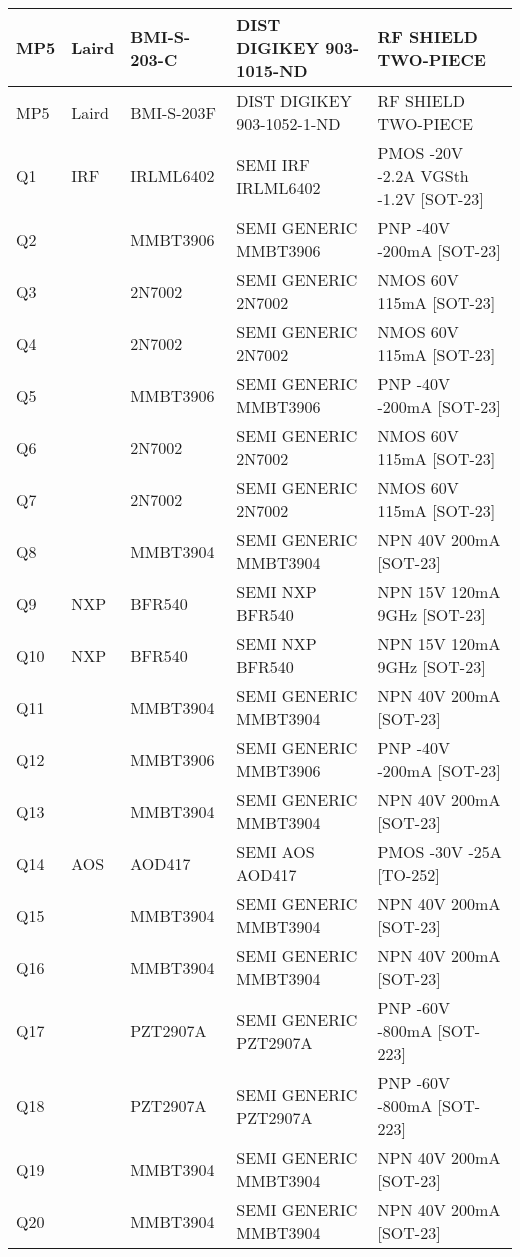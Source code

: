 \begin{longtable}{|l|l|l|l|l|}
\hline
MP5 & Laird & BMI-S-203-C & DIST DIGIKEY 903-1015-ND & RF SHIELD TWO-PIECE \\
\hline
MP5 & Laird & BMI-S-203F & DIST DIGIKEY 903-1052-1-ND & RF SHIELD TWO-PIECE \\
\hline
Q1 & IRF & IRLML6402 & SEMI IRF IRLML6402 & PMOS -20V -2.2A VGSth -1.2V [SOT-23] \\
\hline
Q2 &  & MMBT3906 & SEMI GENERIC MMBT3906 & PNP -40V -200mA [SOT-23] \\
\hline
Q3 &  & 2N7002 & SEMI GENERIC 2N7002 & NMOS 60V 115mA [SOT-23] \\
\hline
Q4 &  & 2N7002 & SEMI GENERIC 2N7002 & NMOS 60V 115mA [SOT-23] \\
\hline
Q5 &  & MMBT3906 & SEMI GENERIC MMBT3906 & PNP -40V -200mA [SOT-23] \\
\hline
Q6 &  & 2N7002 & SEMI GENERIC 2N7002 & NMOS 60V 115mA [SOT-23] \\
\hline
Q7 &  & 2N7002 & SEMI GENERIC 2N7002 & NMOS 60V 115mA [SOT-23] \\
\hline
Q8 &  & MMBT3904 & SEMI GENERIC MMBT3904 & NPN 40V 200mA [SOT-23] \\
\hline
Q9 & NXP & BFR540 & SEMI NXP BFR540 & NPN 15V 120mA 9GHz [SOT-23] \\
\hline
Q10 & NXP & BFR540 & SEMI NXP BFR540 & NPN 15V 120mA 9GHz [SOT-23] \\
\hline
Q11 &  & MMBT3904 & SEMI GENERIC MMBT3904 & NPN 40V 200mA [SOT-23] \\
\hline
Q12 &  & MMBT3906 & SEMI GENERIC MMBT3906 & PNP -40V -200mA [SOT-23] \\
\hline
Q13 &  & MMBT3904 & SEMI GENERIC MMBT3904 & NPN 40V 200mA [SOT-23] \\
\hline
Q14 & AOS & AOD417 & SEMI AOS AOD417 & PMOS -30V -25A [TO-252] \\
\hline
Q15 &  & MMBT3904 & SEMI GENERIC MMBT3904 & NPN 40V 200mA [SOT-23] \\
\hline
Q16 &  & MMBT3904 & SEMI GENERIC MMBT3904 & NPN 40V 200mA [SOT-23] \\
\hline
Q17 &  & PZT2907A & SEMI GENERIC PZT2907A & PNP -60V -800mA [SOT-223] \\
\hline
Q18 &  & PZT2907A & SEMI GENERIC PZT2907A & PNP -60V -800mA [SOT-223] \\
\hline
Q19 &  & MMBT3904 & SEMI GENERIC MMBT3904 & NPN 40V 200mA [SOT-23] \\
\hline
Q20 &  & MMBT3904 & SEMI GENERIC MMBT3904 & NPN 40V 200mA [SOT-23] \\
\hline

\end{longtable}
